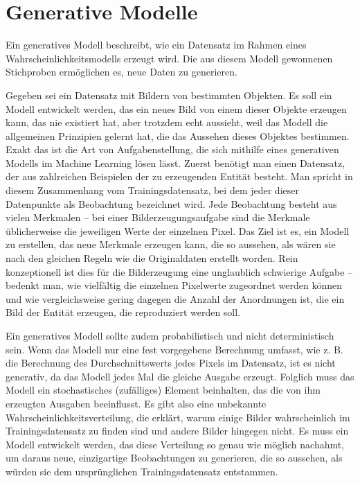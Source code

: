 \section{Generative Modelle}\label{Generative Modelle}


Ein generatives Modell beschreibt, wie ein Datensatz im Rahmen eines Wahrscheinlichkeitsmodells erzeugt wird. Die aus diesem Modell gewonnenen Stichproben ermöglichen es, neue Daten zu generieren.

Gegeben sei ein Datensatz mit Bildern von bestimmten Objekten. Es soll ein Modell entwickelt werden, das ein neues Bild von einem dieser Objekte erzeugen kann, das nie existiert hat, aber trotzdem echt aussieht, weil das Modell die allgemeinen Prinzipien gelernt hat, die das Aussehen dieses Objektes bestimmen. Exakt das ist die Art von Aufgabenstellung, die sich mithilfe eines generativen Modells im Machine Learning lösen lässt. 
Zuerst benötigt man einen Datensatz, der aus zahlreichen Beispielen der zu erzeugenden Entität besteht. Man spricht in diesem Zusammenhang vom Trainingsdatensatz, bei dem jeder dieser Datenpunkte als Beobachtung bezeichnet wird.
Jede Beobachtung besteht aus vielen Merkmalen – bei einer Bilderzeugungsaufgabe sind die Merkmale üblicherweise die jeweiligen Werte der einzelnen Pixel. Das Ziel ist es, ein Modell zu erstellen, das neue Merkmale erzeugen kann, die so aussehen, als wären sie nach den gleichen Regeln wie die Originaldaten erstellt worden. Rein konzeptionell ist dies für die Bilderzeugung eine unglaublich schwierige Aufgabe – bedenkt man, wie vielfältig die einzelnen Pixelwerte zugeordnet werden können und wie vergleichsweise gering dagegen die Anzahl der Anordnungen ist, die ein Bild der Entität erzeugen, die reproduziert werden soll.

Ein generatives Modell sollte zudem probabilistisch und nicht deterministisch sein. Wenn das Modell nur eine fest vorgegebene Berechnung umfasst, wie z. B. die Berechnung des Durchschnittswerts jedes Pixels im Datensatz, ist es nicht generativ, da das Modell jedes Mal die gleiche Ausgabe erzeugt. Folglich muss das Modell ein stochastisches (zufälliges) Element beinhalten, das die von ihm erzeugten Ausgaben beeinflusst.
Es gibt also eine unbekannte Wahrscheinlichkeitsverteilung, die erklärt, warum einige Bilder wahrscheinlich im Trainingsdatensatz zu finden sind und andere Bilder hingegen nicht. Es muss ein Modell entwickelt werden, das diese Verteilung so genau wie möglich nachahmt, um daraus neue, einzigartige Beobachtungen zu generieren, die so aussehen, als würden sie dem ursprünglichen Trainingsdatensatz entstammen.


